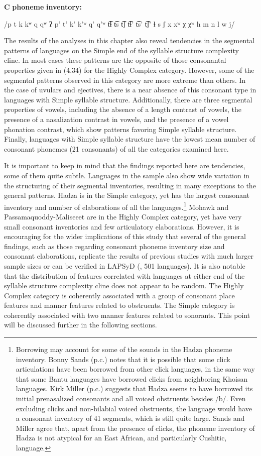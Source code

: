 \textbf{C} \textbf{phoneme} \textbf{inventory:} 

/p t k kʷ q qʷ ʔ p’ t’ k’ k’ʷ q’ q’ʷ t͡ɬ t͡s t͡ʃ t͡ɬ’ t͡s’ t͡ʃ’ ɬ s ʃ x xʷ χ χʷ h m n l w j/

\z

  The results of the analyses in this chapter also reveal tendencies in the segmental patterns of languages on the Simple end of the syllable structure complexity cline. In most cases these patterns are the opposite of those consonantal properties given in (4.34) for the Highly Complex category. However, some of the segmental patterns observed in this category are more extreme than others. In the case of uvulars and ejectives, there is a near absence of this consonant type in languages with Simple syllable structure. Additionally, there are three segmental properties of vowels, including the absence of a length contrast of vowels, the presence of a nasalization contrast in vowels, and the presence of a vowel phonation contrast, which show patterns favoring Simple syllable structure. Finally, languages with Simple syllable structure have the lowest mean number of consonant phonemes (21 consonants) of all the categories examined here.

  It is important to keep in mind that the findings reported here are tendencies, some of them quite subtle. Languages in the sample also show wide variation in the structuring of their segmental inventories, resulting in many exceptions to the general patterns. Hadza is in the Simple category, yet has the largest consonant inventory and number of elaborations of all the languages.\footnote{ \textrm{Borrowing may account for some of the sounds in the Hadza phoneme inventory. Bonny Sands (p.c.) notes that it is possible that some click articulations have been borrowed from other click languages, in the same way that some Bantu languages have borrowed clicks from neighboring Khoisan languages. Kirk Miller (p.c.) suggests that Hadza seems to have borrowed its initial prenasalized consonants and all voiced obstruents besides /b/. Even excluding clicks and non-bilabial voiced obstruents, the language would have a consonant inventory of 41 segments, which is still quite large. Sands and Miller agree that, apart from the presence of clicks, the phoneme inventory of Hadza is not atypical for an East African, and particularly Cushitic, language.}} Mohawk and Passamaquoddy-Maliseeet are in the Highly Complex category, yet have very small consonant inventories and few articulatory elaborations. However, it is encouraging for the wider implications of this study that several of the general findings, such as those regarding consonant phoneme inventory size and consonant elaborations, replicate the results of previous studies with much larger sample sizes or can be verified in LAPSyD (\citealt{MaddiesonEtAl2013}, 501 languages). It is also notable that the distribution of features correlated with languages at either end of the syllable structure complexity cline does not appear to be random. The Highly Complex category is coherently associated with a group of consonant place features and manner features related to obstruents. The Simple category is coherently associated with two manner features related to sonorants. This point will be discussed further in the following sections.

